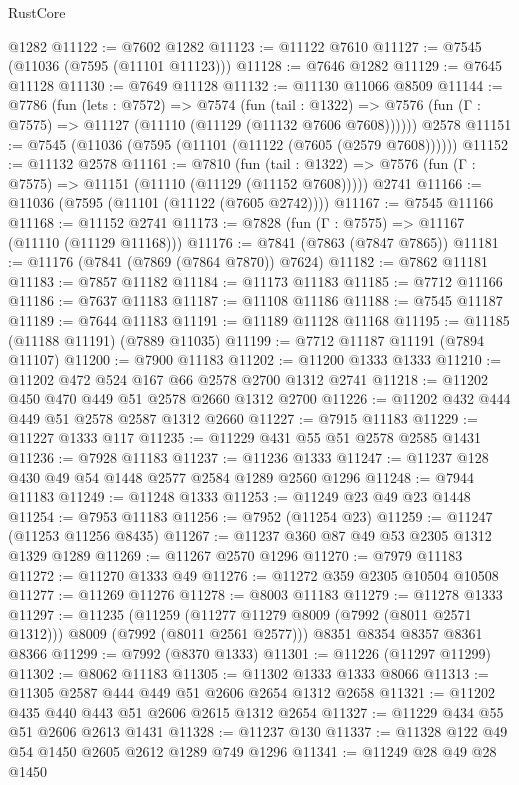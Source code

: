 \begin{lexlean}{RustCore}
\begin{coremodule}
    @1282
@11122 := @7602 @1282
@11123 := @11122 @7610
@11127 := @7545 (@11036 (@7595 (@11101 @11123)))
@11128 := @7646 @1282
@11129 := @7645 @11128
@11130 := @7649 @11128
@11132 := @11130 @11066 @8509
@11144 := @7786
    (fun (lets : @7572) =>
    @7574
      (fun (tail : @1322) =>
      @7576 (fun (Γ : @7575) => @11127 (@11110 (@11129 (@11132 @7606 @7608))))))
    @2578
@11151 := @7545 (@11036 (@7595 (@11101 (@11122 (@7605 (@2579 @7608))))))
@11152 := @11132 @2578
@11161 := @7810
    (fun (tail : @1322) => @7576 (fun (Γ : @7575) => @11151 (@11110 (@11129 (@11152 @7608)))))
    @2741
@11166 := @11036 (@7595 (@11101 (@11122 (@7605 @2742))))
@11167 := @7545 @11166
@11168 := @11152 @2741
@11173 := @7828 (fun (Γ : @7575) => @11167 (@11110 (@11129 @11168)))
@11176 := @7841 (@7863 (@7847 @7865))
@11181 := @11176 (@7841 (@7869 (@7864 @7870)) @7624)
@11182 := @7862 @11181
@11183 := @7857 @11182
@11184 := @11173 @11183
@11185 := @7712 @11166
@11186 := @7637 @11183
@11187 := @11108 @11186
@11188 := @7545 @11187
@11189 := @7644 @11183
@11191 := @11189 @11128 @11168
@11195 := @11185 (@11188 @11191) (@7889 @11035)
@11199 := @7712 @11187 @11191 (@7894 @11107)
@11200 := @7900 @11183
@11202 := @11200 @1333 @1333
@11210 := @11202 @472 @524 @167 @66 @2578 @2700 @1312 @2741
@11218 := @11202 @450 @470 @449 @51 @2578 @2660 @1312 @2700
@11226 := @11202 @432 @444 @449 @51 @2578 @2587 @1312 @2660
@11227 := @7915 @11183
@11229 := @11227 @1333 @117
@11235 := @11229 @431 @55 @51 @2578 @2585 @1431
@11236 := @7928 @11183
@11237 := @11236 @1333
@11247 := @11237 @128 @430 @49 @54 @1448 @2577 @2584 @1289 @2560 @1296
@11248 := @7944 @11183
@11249 := @11248 @1333
@11253 := @11249 @23 @49 @23 @1448
@11254 := @7953 @11183
@11256 := @7952 (@11254 @23)
@11259 := @11247 (@11253 @11256 @8435)
@11267 := @11237 @360 @87 @49 @53 @2305 @1312 @1329 @1289
@11269 := @11267 @2570 @1296
@11270 := @7979 @11183
@11272 := @11270 @1333 @49
@11276 := @11272 @359 @2305 @10504 @10508
@11277 := @11269 @11276
@11278 := @8003 @11183
@11279 := @11278 @1333
@11297 := @11235
    (@11259 (@11277 @11279 @8009 (@7992 (@8011 @2571 @1312))) @8009 (@7992 (@8011 @2561 @2577)))
    @8351
    @8354
    @8357
    @8361
    @8366
@11299 := @7992 (@8370 @1333)
@11301 := @11226 (@11297 @11299)
@11302 := @8062 @11183
@11305 := @11302 @1333 @1333 @8066
@11313 := @11305 @2587 @444 @449 @51 @2606 @2654 @1312 @2658
@11321 := @11202 @435 @440 @443 @51 @2606 @2615 @1312 @2654
@11327 := @11229 @434 @55 @51 @2606 @2613 @1431
@11328 := @11237 @130
@11337 := @11328 @122 @49 @54 @1450 @2605 @2612 @1289 @749 @1296
@11341 := @11249 @28 @49 @28 @1450

\end{coremodule}
\end{lexlean}
